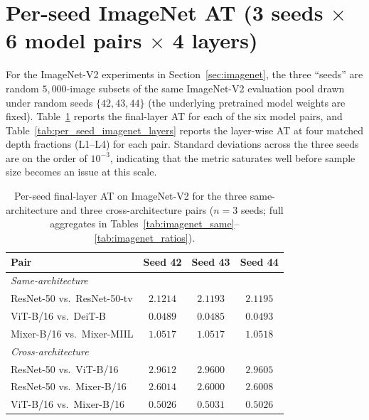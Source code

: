 \documentclass{article}
\begin{document}
\section{Per-seed ImageNet AT (3 seeds $\times$ 6 model pairs $\times$ 4 layers)}
\label{app:seeds_imagenet}

For the ImageNet-V2 experiments in Section~\ref{sec:imagenet}, the three ``seeds'' are random $5{,}000$-image subsets of the same ImageNet-V2 evaluation pool drawn under random seeds $\{42, 43, 44\}$ (the underlying pretrained model weights are fixed). Table~\ref{tab:per_seed_imagenet_final} reports the final-layer AT for each of the six model pairs, and Table~\ref{tab:per_seed_imagenet_layers} reports the layer-wise AT at four matched depth fractions (L1--L4) for each pair. Standard deviations across the three seeds are on the order of $10^{-3}$, indicating that the metric saturates well before sample size becomes an issue at this scale.

\begin{table}[t]
\caption{Per-seed final-layer AT on ImageNet-V2 for the three same-architecture and three cross-architecture pairs ($n{=}3$ seeds; full aggregates in Tables~\ref{tab:imagenet_same}--\ref{tab:imagenet_ratios}).}
\label{tab:per_seed_imagenet_final}
\centering
\small
\begin{tabular}{@{}lccc@{}}
\toprule
Pair & Seed 42 & Seed 43 & Seed 44 \\
\midrule
\multicolumn{4}{l}{\emph{Same-architecture}} \\
ResNet-50 vs.\ ResNet-50-tv             & $2.1214$ & $2.1193$ & $2.1195$ \\
ViT-B/16 vs.\ DeiT-B                    & $0.0489$ & $0.0485$ & $0.0493$ \\
Mixer-B/16 vs.\ Mixer-MIIL              & $1.0517$ & $1.0517$ & $1.0518$ \\
\midrule
\multicolumn{4}{l}{\emph{Cross-architecture}} \\
ResNet-50 vs.\ ViT-B/16                 & $2.9612$ & $2.9600$ & $2.9605$ \\
ResNet-50 vs.\ Mixer-B/16               & $2.6014$ & $2.6000$ & $2.6008$ \\
ViT-B/16 vs.\ Mixer-B/16                & $0.5026$ & $0.5031$ & $0.5026$ \\
\bottomrule
\end{tabular}
\end{table}
\end{document}
